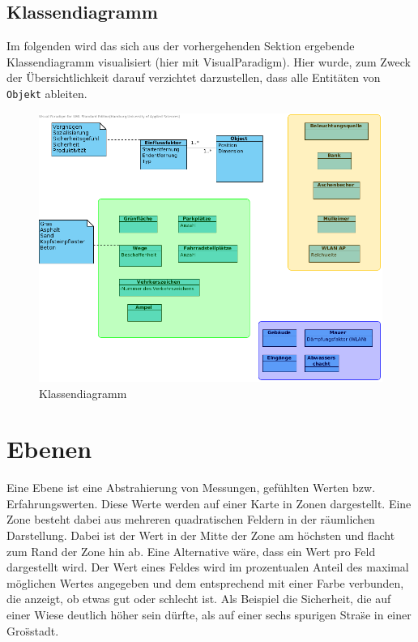 \documentclass[10pt]{scrartcl}
\begin{document}
	\subsection{Klassendiagramm}
	Im folgenden wird das sich aus der vorhergehenden Sektion ergebende Klassendiagramm visualisiert (hier mit VisualParadigm).
	Hier wurde, zum Zweck der Übersichtlichkeit darauf verzichtet darzustellen, dass alle Entitäten von \verb!Objekt! ableiten.
	
	\begin{figure}[H]
    	\label{fig:fachlichesDatenmodellUebersicht}
			\includegraphics[width=\textwidth]{img/ClassDiagram.png}
            \caption{Klassendiagramm}
             \label{img:classDiagram}
	\end{figure} 	
	
\section{Ebenen}\label{sec:Ebenen}
Eine Ebene ist eine Abstrahierung von Messungen, gef\"uhlten Werten bzw. Erfahrungswerten. Diese Werte werden auf einer Karte in Zonen dargestellt. Eine Zone besteht dabei aus mehreren quadratischen Feldern in der r\"aumlichen Darstellung. Dabei ist der Wert in der Mitte der Zone am h\"ochsten und flacht zum Rand der Zone hin ab. Eine Alternative w\"are, dass ein Wert pro Feld dargestellt wird.
\newline Der Wert eines Feldes wird im prozentualen Anteil des maximal m\"oglichen Wertes angegeben und dem entsprechend mit einer Farbe verbunden, die anzeigt, ob etwas gut oder schlecht ist. Als Beispiel die Sicherheit, die auf einer Wiese deutlich h\"oher sein d\"urfte, als auf einer sechs spurigen Stra\"se in einer Gro\"sstadt.
\end{document}
